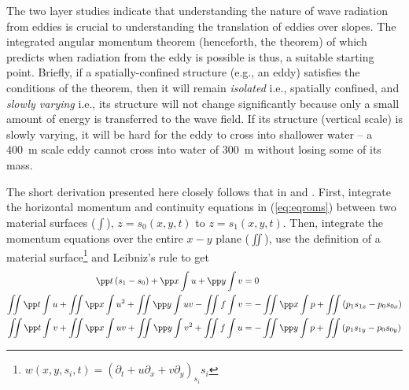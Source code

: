 The two layer studies indicate that understanding the nature of wave radiation from eddies is crucial to understanding the translation of eddies over slopes. The integrated angular momentum theorem (henceforth, the theorem) of \citet{Flierl1983} which predicts when radiation from the eddy is possible is thus, a suitable starting point. Briefly, if a spatially-confined structure (e.g., an eddy) satisfies the conditions of the theorem, then it will remain \emph{isolated} i.e., spatially confined, and \emph{slowly varying} i.e., its structure will not change significantly because only a small amount of energy is transferred to the wave field. If its structure (vertical scale) is slowly varying, it will be hard for the eddy to cross into shallower water -- a \SI{400}{m} scale eddy cannot cross into water of \SI{300}{m} without losing some of its mass.

The short derivation presented here closely follows that in \citet{Flierl1983} and \citet{Flierl1987}. First, integrate the horizontal momentum and continuity equations in (\ref{eq:eqroms}) between two material surfaces ($\int$), $z=s_0(x,y,t)$ to $z=s_1(x,y,t)$. Then, integrate the momentum equations over the entire $x-y$ plane ($\iint$), use the definition of a material surface\footnote{$w(x,y,s_i,t) = \left(∂_t + u∂_x + v∂_y\right)_{s_i} s_i$} and Leibniz's rule to get \citep{Flierl1987}
\begin{subequations}
\label{eq:int}
\begin{align}
\ppt \left(s_1 - s_0\right) + \ppx \int u + \ppy \int v &=0 \\
\iint \ppt \int u + \iint \ppx \int u^2 + \iint \ppy \int uv - \iint f\int v &= -\iint \ppx \int p + \iint \left(p_{1}s_{1x} - p_{0}s_{0x} \right) \\
\iint \ppt \int v + \iint \ppx \int uv + \iint \ppy \int v^2 + \iint f\int u &= -\iint \ppy \int p + \iint \left(p_{1}s_{1y} - p_{0}s_{0y} \right)
\end{align}
\end{subequations}

